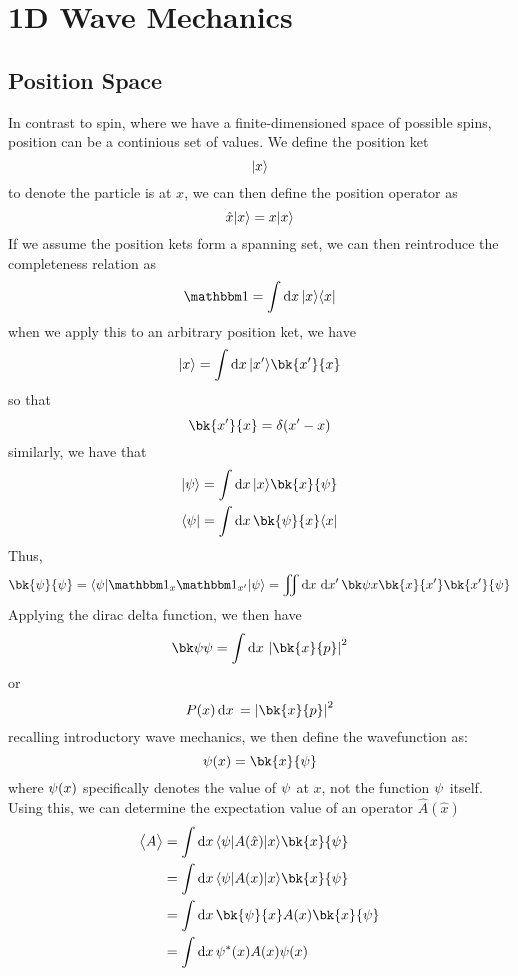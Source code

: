 \chapter{1D Wave Mechanics}
\section{Position Space}
In contrast to spin, where we have a finite-dimensioned space of possible spins, position can be a continious set of values. We define the position ket
\[\lvert x\rangle\]
to denote the particle is at \(x\), we can then define the position operator as
\[\hat x \lvert x\rangle=x\lvert x\rangle\]
If we assume the position kets form a spanning set, we can then reintroduce the completeness relation as
\begin{equation}
	\mathbbm1=\int\d{x}\k{x}\b{x}
\end{equation}
when we apply this to an arbitrary position ket, we have
\begin{equation}
	\k{x} = \int\d{x}\k{x'}\bk{x'}{x}
\end{equation}
so that 
\begin{equation}
	\bk{x'}{x}=\delta(x'-x)
\end{equation}
similarly, we have that
\begin{subequations}
	\begin{align}
		\k{\p}&=\int\d{x}\k{x}\bk{x}{\p}\\
		\b{\p}&=\int\d{x}\bk{\p}{x}\b{x}
	\end{align}
\end{subequations}
Thus,
\[\bk{\p}{\p}=\b\p\mathbbm1_{x}\mathbbm1_{x'}\k\p=\iint\d{x}\d{x'}\bk\p{x}\bk{x}{x'}\bk{x'}{\p}\]
Applying the dirac delta function, we then have
\begin{equation}
	\bk\p\p=\int\d{x}\abs{\bk{x}{p}}^2
\end{equation}
or
\begin{equation}
	P(x)\d{x}=\abs{\bk{x}{p}}^2
\end{equation}
recalling introductory wave mechanics, we then define the wavefunction as:
\begin{equation}
	\p(x) = \bk{x}{\p}
\end{equation}
where \(\psi(x)\) specifically denotes the value of \(\psi\) at \(x\), not the function \(\psi\) itself. Using this, we can determine the expectation value of an operator \(\hat{A}(\hat{x})\) 
\begin{align}
	\vect{A}&=\int\d{x}\b\p A(\hat x)\k{x}\bk{x}{\p}\nonumber\\
		&=\int\d{x}\b\p A(x)\k{x}\bk{x}{\p}\nonumber\\
		&=\int\d{x}\bk{\p}{x}A(x)\bk{x}{\p}\nonumber\\
		&=\int\d{x}\p\ast(x)A(x)\p(x)
\end{align}

